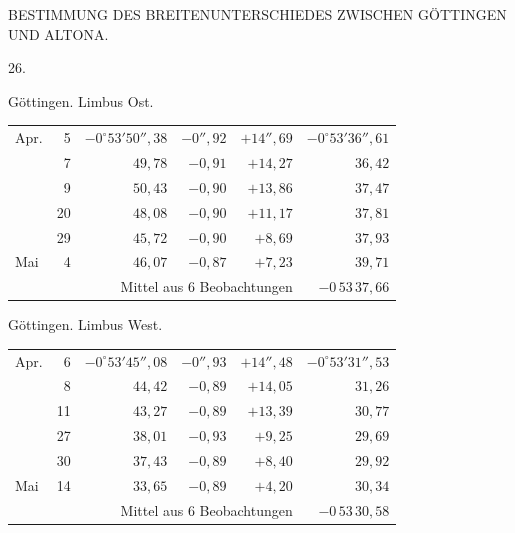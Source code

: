 \clearpage
\noindent{}\parbox[t]{\dimexpr\textwidth-10mm\relax}{\centering\scriptsize BESTIMMUNG DES BREITENUNTERSCHIEDES ZWISCHEN GÖTTINGEN UND ALTONA.}\par
\begin{center}26.\end{center}

\noindent\begin{minipage}[t]{.495\textwidth}\centering Göttingen. Limbus Ost.\par\smallskip
{\scriptsize\setlength{\tabcolsep}{1pt}\renewcommand{\arraystretch}{1.2}\begin{tabular}{lr|r|r|r|r|}
Apr.&5&$-0^\circ53'50''{,}38$&$-0''{,}92$&$+14''{,}69$&$-0^\circ53'36''{,}61$\\
&7&$49{,}78$&$-0{,}91$&$+14{,}27$&$36{,}42$\\
&9&$50{,}43$&$-0{,}90$&$+13{,}86$&$37{,}47$\\
&20&$48{,}08$&$-0{,}90$&$+11{,}17$&$37{,}81$\\
&29&$45{,}72$&$-0{,}90$&$+8{,}69$&$37{,}93$\\
Mai&4&$46{,}07$&$-0{,}87$&$+7{,}23$&$39{,}71$\\
\cline{6-6}\multicolumn{5}{r}{Mittel aus 6 Beobachtungen}&$-0\,53\,37{,}66$
\end{tabular}}\end{minipage}\hfill\begin{minipage}[t]{.495\textwidth}\centering Göttingen. Limbus West.\par\smallskip
{\scriptsize\setlength{\tabcolsep}{1pt}\renewcommand{\arraystretch}{1.2}\begin{tabular}{lr|r|r|r|r}
Apr.&6&$-0^\circ53'45''{,}08$&$-0''{,}93$&$+14''{,}48$&$-0^\circ53'31''{,}53$\\
&8&$44{,}42$&$-0{,}89$&$+14{,}05$&$31{,}26$\\
&11&$43{,}27$&$-0{,}89$&$+13{,}39$&$30{,}77$\\
&27&$38{,}01$&$-0{,}93$&$+9{,}25$&$29{,}69$\\
&30&$37{,}43$&$-0{,}89$&$+8{,}40$&$29{,}92$\\
Mai&14&$33{,}65$&$-0{,}89$&$+4{,}20$&$30{,}34$\\
\cline{6-6}\multicolumn{5}{r}{Mittel aus 6 Beobachtungen}&$-0\,53\,30{,}58$
\end{tabular}}\end{minipage}
\par\vspace{4mm}


